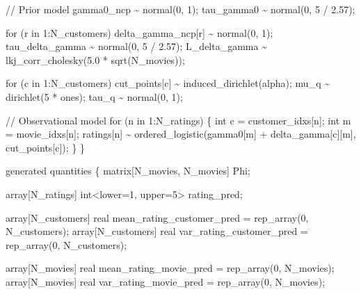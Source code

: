 \documentclass[
  letterpaper,
  DIV=11,
  numbers=noendperiod]{scrartcl}
\newenvironment{Shaded}{\begin{snugshade}}{\end{snugshade}}
\newcommand{\CommentTok}[1]{\textcolor[rgb]{0.37,0.37,0.37}{#1}}
\newcommand{\ControlFlowTok}[1]{\textcolor[rgb]{0.00,0.23,0.31}{#1}}
\newcommand{\DataTypeTok}[1]{\textcolor[rgb]{0.68,0.00,0.00}{#1}}
\newcommand{\DecValTok}[1]{\textcolor[rgb]{0.68,0.00,0.00}{#1}}
\newcommand{\FloatTok}[1]{\textcolor[rgb]{0.68,0.00,0.00}{#1}}
\newcommand{\KeywordTok}[1]{\textcolor[rgb]{0.00,0.23,0.31}{#1}}
\newcommand{\NormalTok}[1]{\textcolor[rgb]{0.00,0.23,0.31}{#1}}
\begin{document}
\begin{codelisting}
\begin{Shaded}
\begin{Highlighting}[]
  \CommentTok{// Prior model}
\NormalTok{  gamma0\_ncp \textasciitilde{} normal(}\DecValTok{0}\NormalTok{, }\DecValTok{1}\NormalTok{);}
\NormalTok{  tau\_gamma0 \textasciitilde{} normal(}\DecValTok{0}\NormalTok{, }\DecValTok{5}\NormalTok{ / }\FloatTok{2.57}\NormalTok{);}

  \ControlFlowTok{for}\NormalTok{ (r }\ControlFlowTok{in} \DecValTok{1}\NormalTok{:N\_customers)}
\NormalTok{    delta\_gamma\_ncp[r] \textasciitilde{} normal(}\DecValTok{0}\NormalTok{, }\DecValTok{1}\NormalTok{);}
\NormalTok{  tau\_delta\_gamma \textasciitilde{} normal(}\DecValTok{0}\NormalTok{, }\DecValTok{5}\NormalTok{ / }\FloatTok{2.57}\NormalTok{);}
\NormalTok{  L\_delta\_gamma \textasciitilde{} lkj\_corr\_cholesky(}\FloatTok{5.0}\NormalTok{ * sqrt(N\_movies));}

  \ControlFlowTok{for}\NormalTok{ (c }\ControlFlowTok{in} \DecValTok{1}\NormalTok{:N\_customers)}
\NormalTok{    cut\_points[c] \textasciitilde{} induced\_dirichlet(alpha);}
\NormalTok{  mu\_q \textasciitilde{} dirichlet(}\DecValTok{5}\NormalTok{ * ones);}
\NormalTok{  tau\_q \textasciitilde{} normal(}\DecValTok{0}\NormalTok{, }\DecValTok{1}\NormalTok{);}

  \CommentTok{// Observational model}
  \ControlFlowTok{for}\NormalTok{ (n }\ControlFlowTok{in} \DecValTok{1}\NormalTok{:N\_ratings) \{}
    \DataTypeTok{int}\NormalTok{ c = customer\_idxs[n];}
    \DataTypeTok{int}\NormalTok{ m = movie\_idxs[n];}
\NormalTok{    ratings[n] \textasciitilde{} ordered\_logistic(gamma0[m] + delta\_gamma[c][m],}
\NormalTok{                                  cut\_points[c]);}
\NormalTok{  \}}
\NormalTok{\}}

\KeywordTok{generated quantities}\NormalTok{ \{}
  \DataTypeTok{matrix}\NormalTok{[N\_movies, N\_movies] Phi;}

  \DataTypeTok{array}\NormalTok{[N\_ratings] }\DataTypeTok{int}\NormalTok{\textless{}}\KeywordTok{lower}\NormalTok{=}\DecValTok{1}\NormalTok{, }\KeywordTok{upper}\NormalTok{=}\DecValTok{5}\NormalTok{\textgreater{} rating\_pred;}

  \DataTypeTok{array}\NormalTok{[N\_customers] }\DataTypeTok{real}\NormalTok{ mean\_rating\_customer\_pred}
\NormalTok{    = rep\_array(}\DecValTok{0}\NormalTok{, N\_customers);}
  \DataTypeTok{array}\NormalTok{[N\_customers] }\DataTypeTok{real}\NormalTok{ var\_rating\_customer\_pred}
\NormalTok{    = rep\_array(}\DecValTok{0}\NormalTok{, N\_customers);}

  \DataTypeTok{array}\NormalTok{[N\_movies] }\DataTypeTok{real}\NormalTok{ mean\_rating\_movie\_pred = rep\_array(}\DecValTok{0}\NormalTok{, N\_movies);}
  \DataTypeTok{array}\NormalTok{[N\_movies] }\DataTypeTok{real}\NormalTok{ var\_rating\_movie\_pred = rep\_array(}\DecValTok{0}\NormalTok{, N\_movies);}


\end{Highlighting}
\end{Shaded}
\end{codelisting}
\end{document}
